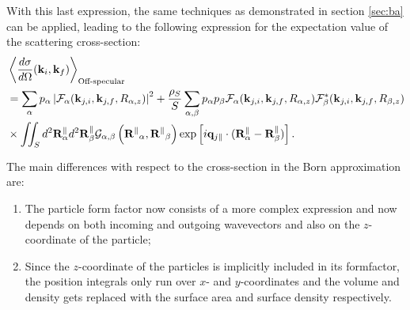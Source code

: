 With this last expression, the same techniques as demonstrated in section \ref{sec:ba} can be applied, leading to the following expression for the expectation value of the scattering cross-section:
\begin{align*}
  & \left\langle \frac{d\sigma}{d\Omega}(\mathbf{k}_i,\mathbf{k}_f) \right\rangle_{\text{Off-specular}}  \\
  & = \sum_\alpha p_\alpha \left\lvert \mathcal{F}_\alpha(\mathbf{k}_{j,i},\mathbf{k}_{j,f}, R_{\alpha,z})\right\rvert ^2 + \frac{\rho_S}{S}\sum_{\alpha,\beta} p_\alpha p_\beta \mathcal{F}_\alpha (\mathbf{k}_{j,i},\mathbf{k}_{j,f}, R_{\alpha,z})\mathcal{F}_\beta^*(\mathbf{k}_{j,i},\mathbf{k}_{j,f}, R_{\beta,z}) \\
  & \times \iint_S d^2\mathbf{R}_\alpha^\parallel d^2\mathbf{R}_\beta^\parallel \mathcal{G}_{\alpha ,\beta}\left( \mathbf{R^\parallel}_{\alpha} , \mathbf{R^\parallel}_{\beta} \right) \exp \left[ i\mathbf{q}_{j\parallel}\cdot (\mathbf{R}_\alpha^\parallel - \mathbf{R}_\beta^\parallel ) \right].
\end{align*}

The main differences with respect to the cross-section in the Born approximation are:
\begin{enumerate}
  \item The particle form factor now consists of a more complex expression and now depends on both incoming and outgoing wavevectors and also on the $z$-coordinate of the particle;
  \item Since the $z$-coordinate of the particles is implicitly included in its formfactor, the position integrals only run over $x$- and $y$-coordinates and the volume and density gets replaced with the surface area and surface density respectively.
\end{enumerate}


